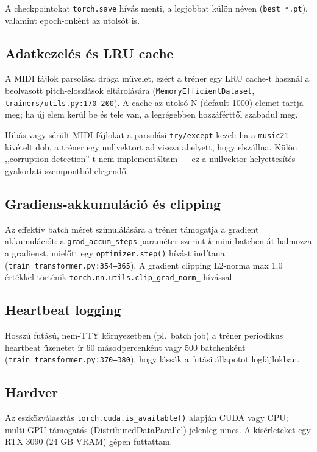 A checkpointokat \texttt{torch.save} hívás menti, a legjobbat külön néven (\texttt{best\_*.pt}), valamint epoch-onként az utolsót is.

\subsection{Adatkezelés és LRU cache}

A MIDI fájlok parsolása drága művelet, ezért a tréner egy LRU cache-t használ a beolvasott pitch-eloszlások eltárolására (\texttt{MemoryEfficientDataset}, \texttt{trainers/utils.py:170--200}). A cache az utolsó N (default 1000) elemet tartja meg; ha új elem kerül be és tele van, a legrégebben hozzáférttől szabadul meg.

Hibás vagy sérült MIDI fájlokat a parsolási \texttt{try/except} kezel: ha a \texttt{music21} kivételt dob, a tréner egy nullvektort ad vissza ahelyett, hogy elszállna. Külön ,,corruption detection''-t nem implementáltam --- ez a nullvektor-helyettesítés gyakorlati szempontból elegendő.

\subsection{Gradiens-akkumuláció és clipping}

Az effektív batch méret szimulálására a tréner támogatja a gradient akkumulációt: a \texttt{grad\_accum\_steps} paraméter szerint $k$ mini-batchen át halmozza a gradienst, mielőtt egy \texttt{optimizer.step()} hívást indítana (\texttt{train\_transformer.py:354--365}). A gradient clipping L2-norma max 1,0 értékkel történik \texttt{torch.nn.utils.clip\_grad\_norm\_} hívással.

\subsection{Heartbeat logging}

Hosszú futású, nem-TTY környezetben (pl.\ batch job) a tréner periodikus heartbeat üzenetet ír 60 másodpercenként vagy 500 batchenként (\texttt{train\_transformer.py:370--380}), hogy lássák a futási állapotot logfájlokban.

\subsection{Hardver}

Az eszközválasztás \texttt{torch.cuda.is\_available()} alapján CUDA vagy CPU; multi-GPU támogatás (DistributedDataParallel) jelenleg nincs. A kísérleteket egy RTX 3090 (24 GB VRAM) gépen futtattam.

